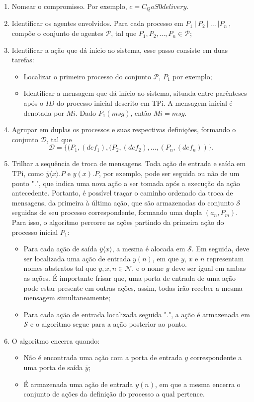 \begin{enumerate}
	\item Nomear o compromisso. Por exemplo, $c = C_QoS0delivery$.
	\item Identificar os agentes envolvidos. Para cada processo em $P_{1}~|~P_{2}~|~...~|P_{n}~$, compõe o conjunto de agentes $\mathcal{P}$, tal que $P_{1}, P_{2}, ..., P_{n} \in \mathcal{P}$;
	\item Identificar a ação que dá início ao sistema, esse passo consiste em duas tarefas:
		\begin{itemize}
			\item Localizar o primeiro processo do conjunto $\mathcal{P}$, $P_{1}$ por exemplo;
			\item Identificar a mensagem que dá início ao sistema, situada entre parênteses após o $ID$ do processo inicial descrito em TPi. A mensagem inicial é denotada por $Mi$. Dado $P_{1}(msg)$, então $Mi = msg$.
		\end{itemize}
	\item Agrupar em duplas os processos e suas respectivas definições, formando o conjunto $\mathcal{D}$, tal que $$\mathcal{D} = \{(P_{1}, (def_{1}), (P_{2}, (def_{2}), \ldots, (P_{n}, (def_{n}))\}.$$
	\item Trilhar a sequência de troca de mensagens. Toda ação de entrada e saída em TPi, como $\overline{y}\langle x \rangle.P$ e $y(x).P$, por exemplo, pode ser seguida ou não de um ponto "$.$", que indica uma nova ação a ser tomada após a execução da ação antecedente. Portanto, é possível traçar o caminho ordenado da troca de mensagens, da primeira à última ação, que são armazenadas do conjunto $\mathcal{S}$ seguidas de seu processo correspondente, formando uma dupla $(a_{n}, P_{m})$. Para isso, o algoritmo percorre as ações partindo da primeira ação do processo inicial $P_{1}$:
		\begin{itemize}
			\item  Para cada ação de saída $\overline{y}\langle x \rangle$, a mesma é alocada em $\mathcal{S}$. Em seguida, deve ser localizada uma ação de entrada $y(n)$, em que $y$, $x$ e $n$ representam nomes abstratos tal que $y, x, n \in \mathcal{N}$, e o nome $y$ deve ser igual em ambas as ações. É importante frisar que, uma porta de entrada de uma ação pode estar presente em outras ações, assim, todas irão receber a mesma mensagem simultaneamente;
			\item Para cada ação de entrada localizada seguida "$.$", a ação é armazenada em $\mathcal{S}$ e o algoritmo segue para a ação posterior ao ponto.
		\end{itemize}
	\item O algoritmo encerra quando:
		\begin{itemize}
			\item Não é encontrada uma ação com a porta de entrada $y$ correspondente a uma porta de saída $\overline{y}$;
			\item É armazenada uma ação de entrada $y(n)$, em que a mesma encerra o conjunto de ações da definição do processo a qual pertence.
		\end{itemize}
\end{enumerate}

